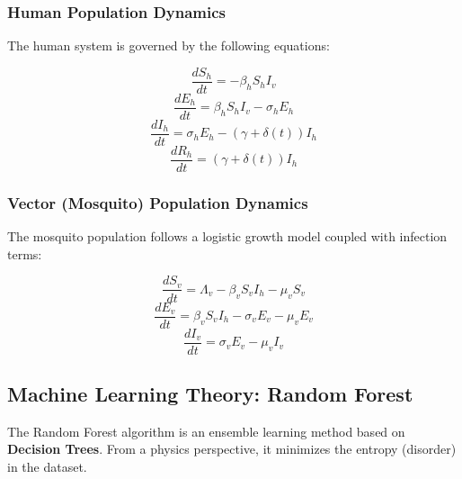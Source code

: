 \documentclass[12pt, a4paper]{article}
\begin{document}
\subsubsection{Human Population Dynamics}
The human system is governed by the following equations:

\begin{equation}
    \frac{dS_h}{dt} = - \beta_h S_h I_v
\end{equation}
\vspace{0.5cm}
\begin{equation}
    \frac{dE_h}{dt} = \beta_h S_h I_v - \sigma_h E_h
\end{equation}
\vspace{0.5cm}
\begin{equation}
    \frac{dI_h}{dt} = \sigma_h E_h - (\gamma + \delta(t)) I_h
\end{equation}
\vspace{0.5cm}
\begin{equation}
    \frac{dR_h}{dt} = (\gamma + \delta(t)) I_h
\end{equation}

\subsubsection{Vector (Mosquito) Population Dynamics}
The mosquito population follows a logistic growth model coupled with infection terms:

\begin{equation}
    \frac{dS_v}{dt} = \Lambda_v - \beta_v S_v I_h - \mu_v S_v
\end{equation}
\vspace{0.5cm}
\begin{equation}
    \frac{dE_v}{dt} = \beta_v S_v I_h - \sigma_v E_v - \mu_v E_v
\end{equation}
\vspace{0.5cm}
\begin{equation}
    \frac{dI_v}{dt} = \sigma_v E_v - \mu_v I_v
\end{equation}

\newpage

\subsection{Machine Learning Theory: Random Forest}
The Random Forest algorithm is an ensemble learning method based on \textbf{Decision Trees}. From a physics perspective, it minimizes the entropy (disorder) in the dataset.
\end{document}
